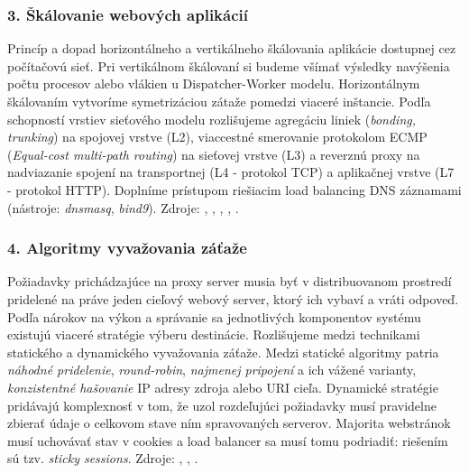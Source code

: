 \documentclass[11pt, a4paper]{article}
\begin{document}
\subsubsection*{3. Škálovanie webových aplikácií}
Princíp a dopad horizontálneho a vertikálneho škálovania 
aplikácie dostupnej cez počítačovú sieť. Pri vertikálnom škálovaní si budeme všímať výsledky navýšenia
počtu procesov alebo vlákien u Dispatcher-Worker modelu. Horizontálnym škálovaním vytvoríme
symetrizáciou zátaže pomedzi viaceré inštancie. Podľa schopností vrstiev sieťového modelu rozlišujeme 
agregáciu liniek (\emph{bonding, trunking}) na spojovej vrstve (L2), viaccestné smerovanie protokolom ECMP 
(\emph{Equal-cost multi-path routing})  na sieťovej vrstve (L3) a reverznú proxy na nadviazanie spojení na 
transportnej (L4 - protokol TCP) a aplikačnej vrstve (L7 - protokol HTTP). Doplníme 
prístupom riešiacim load balancing DNS záznamami (nástroje: \emph{dnsmasq}, 
\emph{bind9}). Zdroje: \cite{link-trunking}, \cite{RFC2991}, \cite{RFC2992}, \cite{server-load-balancing}, 
\cite{load-balance-in-distributed-system}.

\subsubsection*{4. Algoritmy vyvažovania záťaže}
Požiadavky prichádzajúce na proxy server musia byť v 
distribuovanom prostredí pridelené na práve jeden cieľový webový server, ktorý ich vybaví a vráti odpoveď.
Podľa nárokov na výkon a správanie sa jednotlivých komponentov systému existujú viaceré stratégie výberu 
destinácie. Rozlišujeme medzi technikami statického a dynamického vyvažovania záťaže. Medzi statické 
algoritmy patria \emph{náhodné pridelenie}, \emph{round-robin}, \emph{najmenej pripojení} a ich vážené 
varianty, \emph{konzistentné hašovanie} IP adresy zdroja alebo URI cieľa. Dynamické stratégie pridávajú 
komplexnosť v tom, že uzol rozdeľujúci požiadavky musí pravidelne zbierať údaje o celkovom stave ním 
spravovaných serverov. Majorita webstránok musí uchovávať stav v cookies a load balancer sa musí tomu podriadiť: riešením sú tzv. \emph{sticky sessions}. Zdroje: \cite{load-balance-algo}, 
\cite{algorithm-performance}, \cite{sticky-session}.
\end{document}
